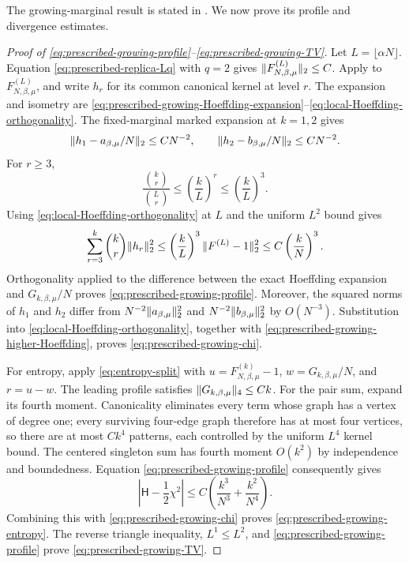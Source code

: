 \documentclass[11pt,reqno]{amsart}
\numberwithin{equation}{section}
\theoremstyle{plain}
\theoremstyle{definition}
\DeclarePairedDelimiter{\norm}{\lVert}{\rVert}
\newcommand{\be}{\beta}
\newcommand{\Hr}{\mathsf H}
\begin{document}
The growing-marginal result is stated in . We now prove its profile and divergence estimates.

\begin{proof}[Proof of \eqref{eq:prescribed-growing-profile}--\eqref{eq:prescribed-growing-TV}]
Let $L=\lfloor\alpha N\rfloor$.  Equation \eqref{eq:prescribed-replica-Lq} with $q=2$ gives $\norm{F_{N,\be,\mu}^{(L)}}_2\leq C$.  Apply  to $F_{N,\be,\mu}^{(L)}$, and write $h_r$ for its common canonical kernel at level $r$. The expansion and isometry are \eqref{eq:prescribed-growing-Hoeffding-expansion}--\eqref{eq:local-Hoeffding-orthogonality}. The fixed-marginal marked expansion at $k=1,2$ gives
\begin{equation}
 \norm{h_1-a_{\be,\mu}/N}_2\leq C N^{-2},
 \qquad
 \norm{h_2-b_{\be,\mu}/N}_2\leq C N^{-2}.
 \label{eq:prescribed-growing-first-Hoeffding-rates}
\end{equation}
For $r\geq3$,
\begin{equation}
 \frac{\binom kr}{\binom Lr}\leq\left(\frac{k}{L}\right)^r
 \leq\left(\frac{k}{L}\right)^3.
 \label{eq:prescribed-growing-binomial-comparison}
\end{equation}
Using \eqref{eq:local-Hoeffding-orthogonality} at $L$ and the uniform $L^2$ bound gives
\begin{equation}
 \sum_{r=3}^k\binom kr\norm{h_r}_2^2
 \leq\left(\frac{k}{L}\right)^3\norm{F^{(L)}-1}_2^2
 \leq C\left(\frac{k}{N}\right)^3.
 \label{eq:prescribed-growing-higher-Hoeffding}
\end{equation}
Orthogonality applied to the difference between the exact Hoeffding expansion and $G_{k,\be,\mu}/N$ proves \eqref{eq:prescribed-growing-profile}.  Moreover, the squared norms of $h_1$ and $h_2$ differ from $N^{-2}\norm{a_{\be,\mu}}_2^2$ and $N^{-2}\norm{b_{\be,\mu}}_2^2$ by $O(N^{-3})$.  Substitution into \eqref{eq:local-Hoeffding-orthogonality}, together with \eqref{eq:prescribed-growing-higher-Hoeffding}, proves \eqref{eq:prescribed-growing-chi}.

For entropy, apply \eqref{eq:entropy-split} with $u=F_{N,\be,\mu}^{(k)}-1$, $w=G_{k,\be,\mu}/N$, and $r=u-w$.  The leading profile satisfies $\norm{G_{k,\be,\mu}}_4\leq Ck$.  For the pair sum, expand its fourth moment.  Canonicality eliminates every term whose graph has a vertex of degree one; every surviving four-edge graph therefore has at most four vertices, so there are at most $Ck^4$ patterns, each controlled by the uniform $L^4$ kernel bound.  The centered singleton sum has fourth moment $O(k^2)$ by independence and boundedness.  Equation \eqref{eq:prescribed-growing-profile} consequently gives
\begin{equation}
 \left|\Hr-\frac12\chi^2\right|
 \leq C\left(\frac{k^3}{N^3}+\frac{k^2}{N^4}\right).
 \label{eq:prescribed-growing-entropy-remainder}
\end{equation}
Combining this with \eqref{eq:prescribed-growing-chi} proves \eqref{eq:prescribed-growing-entropy}.  The reverse triangle inequality, $L^1\leq L^2$, and \eqref{eq:prescribed-growing-profile} prove \eqref{eq:prescribed-growing-TV}.
\end{proof}
\end{document}
